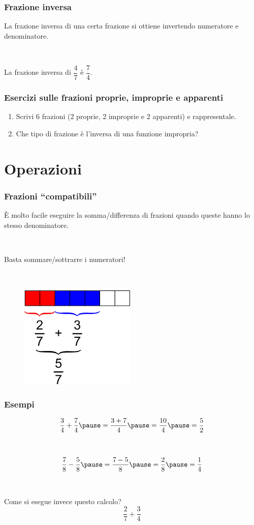 \documentclass[]{beamer}
\theoremstyle{plain}
\begin{document}
\begin{frame}
\frametitle{Frazione inversa}
La frazione inversa di una certa frazione si ottiene \alert{invertendo numeratore e denominatore}.\pause

~

La frazione inversa di $ \dfrac{4}{7} $ è $ \dfrac{7}{4} $.
\end{frame}


\begin{frame}
  \frametitle{Esercizi sulle frazioni proprie, improprie e apparenti}
  \begin{enumerate}
    \item Scrivi 6 frazioni (2 proprie, 2 improprie e 2 apparenti) e rappresentale.
    \item Che tipo di frazione è l'inversa di una funzione impropria?
  \end{enumerate}
\end{frame}
  




\section{Operazioni}


\begin{frame}
\frametitle{Frazioni ``compatibili''}
È molto facile eseguire la somma/differenza di frazioni quando queste hanno \alert{lo stesso denominatore}.\pause

~

Basta sommare/sottrarre i numeratori!

~

\begin{figure}
  \includegraphics[width=.4\columnwidth]{img/sommafraz.png}
\end{figure}
\end{frame}


\begin{frame}
\frametitle{Esempi}
\[ \frac{3}{4} + \frac{7}{4} \pause= \frac{3+7}{4}\pause = \frac{10}{4}\pause = \frac{5}{2}  \]\pause

~

\[ \frac{7}{8} - \frac{5}{8} \pause= \frac{7-5}{8}\pause = \frac{2}{8}\pause = \frac{1}{4}  \]\pause

~

Come si esegue invece questo calcolo?
\[ \frac{2}{7} + \frac{3}{4} \]
\end{frame}
\end{document}
